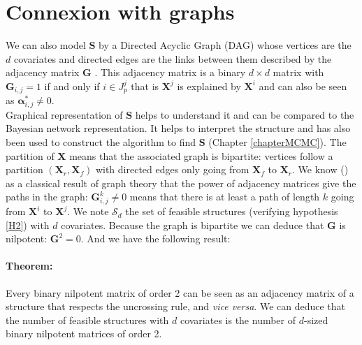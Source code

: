 \documentclass[12pt,a4paper]{report}
\begin{document}
 	\FloatBarrier		
			
		
\section{Connexion with graphs}\label{sectiongraph}
	We can also model $\boldsymbol{S}$ by a Directed Acyclic Graph (DAG) whose vertices are the $d$ covariates and directed edges are the links  between them described by the adjacency matrix $\boldsymbol{G}$ \cite{bondy1976graph}. This adjacency matrix is a binary $d\times d$ matrix with $\boldsymbol{G}_{i,j}=1$ if and only if $i \in J_p^j$ that is $\boldsymbol{X}^j$ is explained by $\boldsymbol{X}^i$ and can also be seen as $\boldsymbol{\alpha}^*_{i,j}\neq 0$.\\
	
	Graphical representation of $\boldsymbol{S}$ helps to understand it and can be compared to the Bayesian network representation. It helps to interpret the structure and has also been used to construct the algorithm to find $\boldsymbol{S}$ (Chapter \ref{chapterMCMC}).
	The partition of $\boldsymbol{X}$ means that the associated graph is bipartite: vertices follow a partition $(\boldsymbol{X}_r,\boldsymbol{X}_f)$ with directed edges only going from $\boldsymbol{X}_f$ to $\boldsymbol{X}_r$.
	We know (\cite{biggs1993algebraic}) as a classical result of graph theory that the power of adjacency matrices give the paths in the graph: $\boldsymbol{G}^k_{i,j}\neq 0$ means that there is at least a path of length $k$ going from $\boldsymbol{X}^i$ to $\boldsymbol{X}^j$. We note $\mathcal{S}_d$ the set of feasible structures (verifying hypothesis \ref{H2}) with $d$ covariates. Because the graph is bipartite we can deduce that $\boldsymbol{G}$ is nilpotent: $\boldsymbol{G}^2=0$. And we have the following result:\\
	
	\paragraph{Theorem:} Every binary nilpotent matrix of order 2 can be seen as an adjacency matrix of a structure that respects the uncrossing rule, and {\it vice versa}. We can deduce that the number of feasible structures with $d$ covariates is the number of $d$-sized binary nilpotent matrices of order 2. \\
	 
\end{document}
